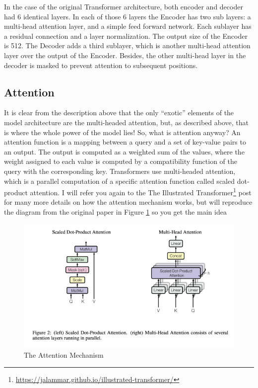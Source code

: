 \documentclass{article}
\begin{document}
In the case of the original Transformer architecture, both encoder and decoder had 6 identical layers. In each of those 6 layers the Encoder has two sub layers: a multi-head attention layer, and a simple feed forward network. Each sublayer has a residual connection and a layer normalization. The output size of the Encoder is 512. The Decoder adds a third sublayer, which is another multi-head attention layer over the output of the Encoder. Besides, the other multi-head layer in the decoder is masked to prevent attention to subsequent positions.

\subsection{Attention}

It is clear from the description above that the only “exotic” elements of the model architecture are the multi-headed attention, but, as described above, that is where the whole power of the model lies! So, what is attention anyway? An attention function is a mapping between a query and a set of key-value pairs to an output. The output is computed as a weighted sum of the values, where the weight assigned to each value is computed by a compatibility function of the query with the corresponding key. Transformers use multi-headed attention, which is a parallel computation of a specific attention function called scaled dot-product attention. I will refer you again to the The Illustrated Transformer\footnote{\url{https://jalammar.github.io/illustrated-transformer/}} post for many more details on how the attention mechanism works, but will reproduce the diagram from the original paper in Figure \ref{fig:attention} so you get the main idea

\begin{figure}
    \centering
    \includegraphics[width=\textwidth,height=\textheight,keepaspectratio]{02-03.png}
    \caption{The Attention Mechanism}
    \label{fig:attention}
\end{figure}
\end{document}
